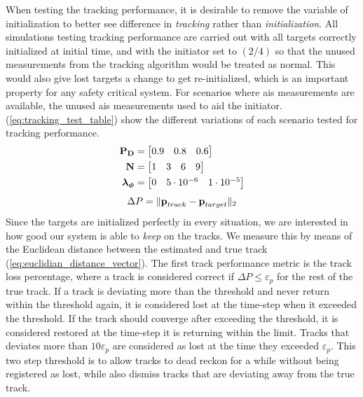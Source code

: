 When testing the tracking performance, it is desirable to remove the variable of initialization to better see difference in \emph{tracking} rather than \emph{initialization}. All simulations testing tracking performance are carried out with all targets correctly initialized at initial time, and with the initiator set to \( (2/4) \) so that the unused measurements from the tracking algorithm would be treated as normal. This would also give lost targets a change to get re-initialized, which is an important property for any safety critical system. For scenarios where \gls{ais} measurements are available, the unused \gls{ais} measurements used to aid the initiator. (\ref{eq:tracking_test_table}) show the different variations of each scenario tested for tracking performance. 
\begin{equation}\label{eq:tracking_test_table}
\begin{split}
\boldsymbol{\mathbf{P_D}} &= \begin{bmatrix} 0.9 & 0.8 & 0.6 \end{bmatrix} \\
\boldsymbol{\mathbf{N}} &= \begin{bmatrix} 1 & 3 & 6 & 9 \end{bmatrix} \\
\boldsymbol{\mathbf{\lambda_\phi}} &= \begin{bmatrix} 0 & 5\cdot10^{-6} & 1\cdot10^{-5} \end{bmatrix}
\end{split}
\end{equation}
\begin{equation}
	\Delta P = \| \boldsymbol{\mathbf{p}}_{track}-\boldsymbol{\mathbf{p}}_{target} \|_2
\label{eq:euclidian_distance_vector}
\end{equation}
Since the targets are initialized perfectly in every situation, we are interested in how good our system is able to \emph{keep} on the tracks. We measure this by means of the Euclidean distance between the estimated and true track (\ref{eq:euclidian_distance_vector}). The first track performance metric is the track loss percentage, where a track is considered correct if \(\Delta P \leq \varepsilon_p\) for the rest of the true track. If a track is deviating more than the threshold and never return within the threshold again, it is considered lost at the time-step when it exceeded the threshold. If the track should converge after exceeding the threshold, it is considered restored at the time-step it is returning within the limit. Tracks that deviates more than \(10\varepsilon_p\) are considered as lost at the time they exceeded \(\varepsilon_p\). This two step threshold is to allow tracks to dead reckon for a while without being registered as lost, while also dismiss tracks that are deviating away from the true track.

